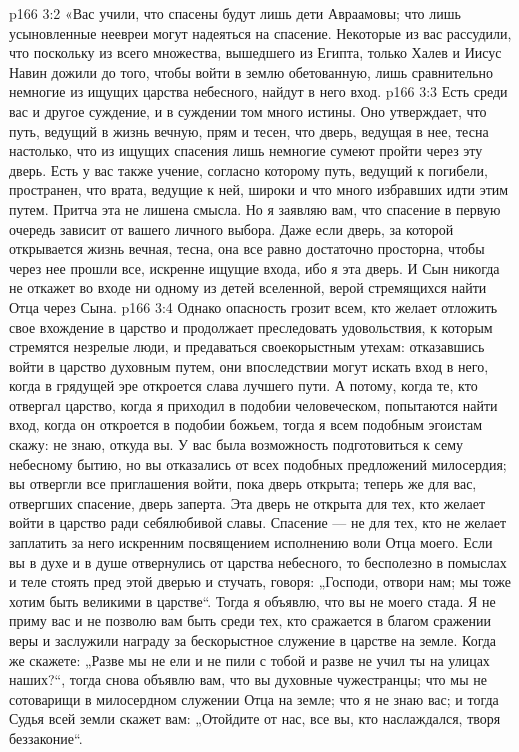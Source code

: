 \vs p166 3:2 \pc «Вас учили, что спасены будут лишь дети Авраамовы; что лишь усыновленные неевреи могут надеяться на спасение. Некоторые из вас рассудили, что поскольку из всего множества, вышедшего из Египта, только Халев и Иисус Навин дожили до того, чтобы войти в землю обетованную, лишь сравнительно немногие из ищущих царства небесного, найдут в него вход.
\vs p166 3:3 Есть среди вас и другое суждение, и в суждении том много истины. Оно утверждает, что путь, ведущий в жизнь вечную, прям и тесен, что дверь, ведущая в нее, тесна настолько, что из ищущих спасения лишь немногие сумеют пройти через эту дверь. Есть у вас также учение, согласно которому путь, ведущий к погибели, пространен, что врата, ведущие к ней, широки и что много избравших идти этим путем. Притча эта не лишена смысла. Но я заявляю вам, что спасение в первую очередь зависит от вашего личного выбора. Даже если дверь, за которой открывается жизнь вечная, тесна, она все равно достаточно просторна, чтобы через нее прошли все, искренне ищущие входа, ибо я эта дверь. И Сын никогда не откажет во входе ни одному из детей вселенной, верой стремящихся найти Отца через Сына.
\vs p166 3:4 Однако опасность грозит всем, кто желает отложить свое вхождение в царство и продолжает преследовать удовольствия, к которым стремятся незрелые люди, и предаваться своекорыстным утехам: отказавшись войти в царство духовным путем, они впоследствии могут искать вход в него, когда в грядущей эре откроется слава лучшего пути. А потому, когда те, кто отвергал царство, когда я приходил в подобии человеческом, попытаются найти вход, когда он откроется в подобии божьем, тогда я всем подобным эгоистам скажу: не знаю, откуда вы. У вас была возможность подготовиться к сему небесному бытию, но вы отказались от всех подобных предложений милосердия; вы отвергли все приглашения войти, пока дверь открыта; теперь же для вас, отвергших спасение, дверь заперта. Эта дверь не открыта для тех, кто желает войти в царство ради себялюбивой славы. Спасение --- не для тех, кто не желает заплатить за него искренним посвящением исполнению воли Отца моего. Если вы в духе и в душе отвернулись от царства небесного, то бесполезно в помыслах и теле стоять пред этой дверью и стучать, говоря: „Господи, отвори нам; мы тоже хотим быть великими в царстве“. Тогда я объявлю, что вы не моего стада. Я не приму вас и не позволю вам быть среди тех, кто сражается в благом сражении веры и заслужили награду за бескорыстное служение в царстве на земле. Когда же скажете: „Разве мы не ели и не пили с тобой и разве не учил ты на улицах наших?“, тогда снова объявлю вам, что вы духовные чужестранцы; что мы не сотоварищи в милосердном служении Отца на земле; что я не знаю вас; и тогда Судья всей земли скажет вам: „Отойдите от нас, все вы, кто наслаждался, творя беззаконие“.
